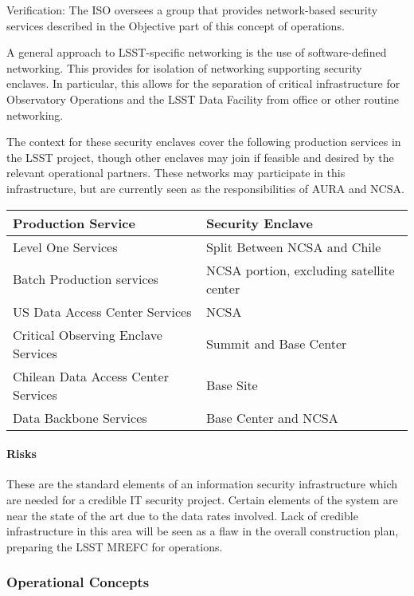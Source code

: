 Verification: The ISO oversees a group that provides network-based security
services described in the Objective part of this concept of operations.

A general approach to LSST-specific networking is the use of software-defined
networking. This provides for isolation of networking supporting security enclaves.
In particular, this allows for the separation of critical infrastructure for
Observatory Operations and the LSST Data Facility from office or other routine
networking.

The context for these security enclaves cover the following production services
in the LSST project, though other enclaves may join if feasible and desired by
the relevant operational partners. These networks may participate in this
infrastructure, but are currently seen as the responsibilities of AURA and NCSA.

\begin{longtable}{|p{}|p{}|} \hline
\textbf{Production Service} & \textbf{Security Enclave} \\\hline
Level One Services & Split Between NCSA and Chile  \\\hline
Batch Production services & NCSA portion, excluding satellite center \\\hline
US Data Access Center Services & NCSA \\\hline
Critical Observing Enclave Services & Summit and Base Center \\\hline
Chilean Data Access Center Services & Base Site \\\hline
Data Backbone Services & Base Center and NCSA \\\hline
\end{longtable}

\paragraph{Risks}

These are the standard elements of an information security infrastructure which
are needed for a credible IT security project. Certain elements of the system
are near the state of the art due to the data rates involved. Lack of credible
infrastructure in this area will be seen as a flaw in the overall construction
plan, preparing the LSST MREFC for operations.

\subsubsection{Operational Concepts}

